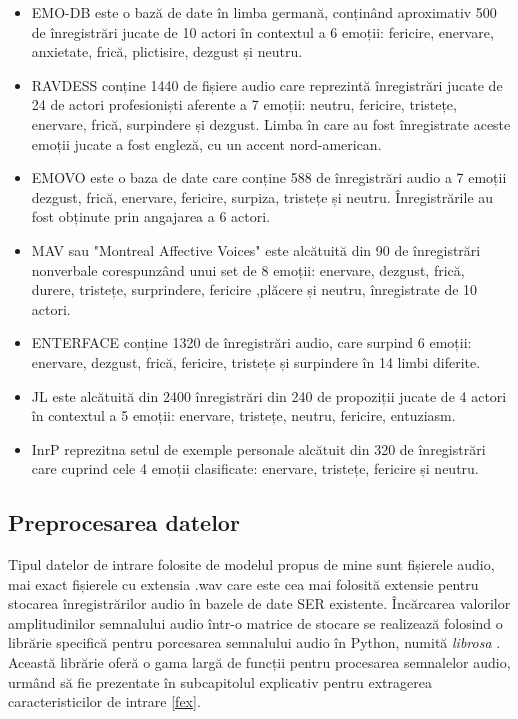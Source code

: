 \documentclass[a4paper,12pt]{book}
\begin{document}
					\begin{itemize}
						\item EMO-DB \cite{emodb} este o bază de date în limba germană, conținând aproximativ 500 de înregistrări jucate de 10 actori în contextul a 6 emoții: fericire, enervare, anxietate, frică, plictisire, dezgust și neutru. 
						
						\item RAVDESS \cite{ravdess} conține 1440 de fișiere audio care reprezintă înregistrări jucate de 24 de actori profesioniști aferente a 7 emoții: neutru, fericire, tristețe, enervare, frică, surpindere și dezgust. Limba în care au fost înregistrate aceste emoții jucate a fost engleză, cu un accent nord-american.
						
						
						\item EMOVO \cite{emovo} este o baza de date care conține 588 de înregistrări audio a 7 emoții dezgust, frică, enervare, fericire, surpiza, tristețe și neutru. Înregistrările au fost obținute prin angajarea a 6 actori.
						
						\item MAV \cite{mav} sau "Montreal Affective Voices" este alcătuită din 90 de înregistrări nonverbale corespunzând unui set de 8 emoții: enervare, dezgust, frică, durere, tristețe, surprindere, fericire ,plăcere și neutru, înregistrate de 10 actori.
						
						\item ENTERFACE \cite{enterface} conține 1320 de înregistrări audio, care surpind 6 emoții: enervare, dezgust, frică, fericire, tristețe și surpindere în 14 limbi diferite.
						
						\item JL \cite{JL} este alcătuită din 2400 înregistrări din 240 de propoziții jucate de 4 actori în contextul a 5 emoții: enervare, tristețe, neutru, fericire, entuziasm.
						
						\item InrP reprezitna setul de exemple personale alcătuit din 320 de înregistrări care cuprind cele 4 emoții clasificate: enervare, tristețe, fericire și neutru.							
					\end{itemize}
				
				\subsection{Preprocesarea datelor}
					Tipul datelor de intrare folosite de modelul propus de mine sunt fișierele audio, mai exact fișierele cu extensia .wav care este cea mai folosită extensie pentru stocarea înregistrărilor audio în bazele de date SER existente. Încărcarea valorilor amplitudinilor semnalului audio într-o matrice de stocare se realizează folosind o librărie specifică pentru porcesarea semnalului audio în Python, numită \textit{librosa} \cite{librosa}. Această librărie oferă o gama largă de funcții pentru procesarea semnalelor audio,  urmând să fie prezentate în subcapitolul explicativ pentru extragerea caracteristicilor de intrare \ref{fex}.
					
\end{document}
